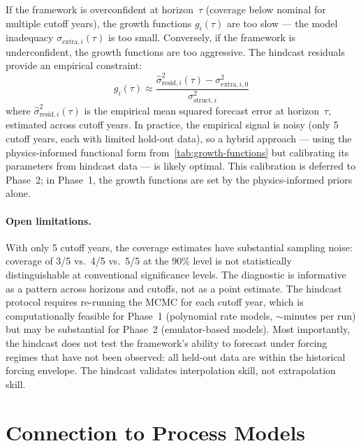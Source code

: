 \documentclass[11pt]{article}
\begin{document}
If the framework is overconfident at horizon~$\tau$ (coverage below nominal for multiple cutoff years), the growth functions $g_i(\tau)$ are too slow --- the model inadequacy $\sigma_{\text{extra},i}(\tau)$ is too small.  Conversely, if the framework is underconfident, the growth functions are too aggressive.  The hindcast residuals provide an empirical constraint:
\begin{equation}
  g_i(\tau) \approx \frac{\hat{\sigma}_{\text{resid},i}^2(\tau) - \sigma_{\text{extra},i,0}^2}{\sigma_{\text{struct},i}^2}
\end{equation}
where $\hat{\sigma}_{\text{resid},i}^2(\tau)$ is the empirical mean squared forecast error at horizon~$\tau$, estimated across cutoff years.  In practice, the empirical signal is noisy (only 5 cutoff years, each with limited hold-out data), so a hybrid approach --- using the physics-informed functional form from~\cref{tab:growth-functions} but calibrating its parameters from hindcast data --- is likely optimal.  This calibration is deferred to Phase~2; in Phase~1, the growth functions are set by the physics-informed priors alone.

\paragraph{Open limitations.}  With only 5 cutoff years, the coverage estimates have substantial sampling noise: coverage of 3/5 vs.\ 4/5 vs.\ 5/5 at the 90\% level is not statistically distinguishable at conventional significance levels.  The diagnostic is informative as a pattern across horizons and cutoffs, not as a point estimate.  The hindcast protocol requires re-running the MCMC for each cutoff year, which is computationally feasible for Phase~1 (polynomial rate models, $\sim$minutes per run) but may be substantial for Phase~2 (emulator-based models).  Most importantly, the hindcast does not test the framework's ability to forecast under forcing regimes that have not been observed: all held-out data are within the historical forcing envelope.  The hindcast validates interpolation skill, not extrapolation skill.


\section{Connection to Process Models}
\label{sec:process-models}
\end{document}
